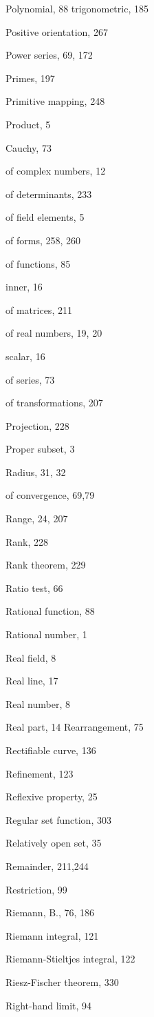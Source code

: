 \documentclass[10pt]{article}
\begin{document}
Polynomial, 88 trigonometric, 185

Positive orientation, 267

Power series, 69, 172

Primes, 197

Primitive mapping, 248

Product, 5

Cauchy, 73

of complex numbers, 12

of determinants, 233

of field elements, 5

of forms, 258, 260

of functions, 85

inner, 16

of matrices, 211

of real numbers, 19, 20

scalar, 16

of series, 73

of transformations, 207

Projection, 228

Proper subset, 3

Radius, 31, 32

of convergence, 69,79

Range, 24, 207

Rank, 228

Rank theorem, 229

Ratio test, 66

Rational function, 88

Rational number, 1

Real field, 8

Real line, 17

Real number, 8

Real part, 14 Rearrangement, 75

Rectifiable curve, 136

Refinement, 123

Reflexive property, 25

Regular set function, 303

Relatively open set, 35

Remainder, 211,244

Restriction, 99

Riemann, B., 76, 186

Riemann integral, 121

Riemann-Stieltjes integral, 122

Riesz-Fischer theorem, 330

Right-hand limit, 94
\end{document}
